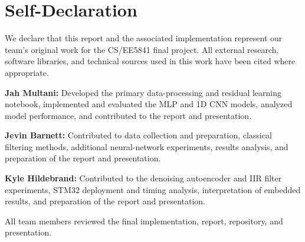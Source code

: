 \documentclass[conference]{IEEEtran}
\begin{document}
\section*{Self-Declaration}

We declare that this report and the associated implementation represent
our team's original work for the CS/EE5841 final project. All external
research, software libraries, and technical sources used in this work
have been cited where appropriate.

\textbf{Jah Multani:} Developed the primary data-processing and residual
learning notebook, implemented and evaluated the MLP and 1D CNN models,
analyzed model performance, and contributed to the report and presentation.

\textbf{Jevin Barnett:} Contributed to data collection and preparation,
classical filtering methods, additional neural-network experiments,
results analysis, and preparation of the report and presentation.

\textbf{Kyle Hildebrand:} Contributed to the denoising autoencoder and IIR
filter experiments, STM32 deployment and timing analysis, interpretation
of embedded results, and preparation of the report and presentation.

All team members reviewed the final implementation, report, repository,
and presentation.
\end{document}
